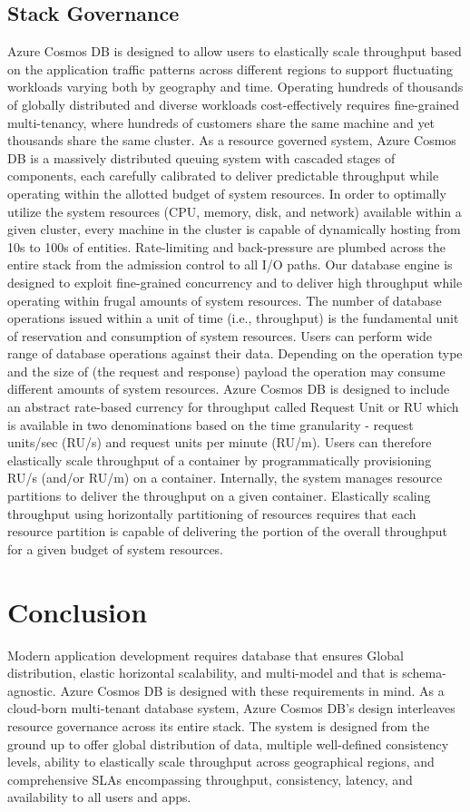 \subsection{Stack Governance}
Azure Cosmos DB is designed to allow users to elastically scale throughput based on the application traffic patterns across different regions to support fluctuating workloads varying both by geography and time. Operating hundreds of thousands of globally distributed and diverse workloads cost-effectively requires fine-grained multi-tenancy, where hundreds of customers share the same machine and yet thousands share the same cluster. As a resource governed system, Azure Cosmos DB is a massively distributed queuing system with cascaded stages of components, each carefully calibrated to deliver predictable throughput while operating within the allotted budget of system resources. In order to optimally utilize the system resources (CPU, memory, disk, and network) available within a given cluster, every machine in the cluster is capable of dynamically hosting from 10s to 100s of entities. Rate-limiting and back-pressure are plumbed across the entire stack from the admission control to all I/O paths. Our database engine is designed to exploit fine-grained concurrency and to deliver high throughput while operating within frugal amounts of system resources.
The number of database operations issued within a unit of time (i.e., throughput) is the fundamental unit of reservation and consumption of system resources. Users can perform wide range of database operations against their data. Depending on the operation type and the size of (the request and response) payload the operation may consume different amounts of system resources. Azure Cosmos DB is designed to include an abstract rate-based currency for throughput called Request Unit or RU which is available in two denominations based on the time granularity - request units/sec (RU/s) and request units per minute (RU/m). Users can therefore elastically scale throughput of a container by programmatically provisioning RU/s (and/or RU/m) on a container. Internally, the system manages resource partitions to deliver the throughput on a given container. Elastically scaling throughput using horizontally partitioning of resources requires that each resource partition is capable of delivering the portion of the overall throughput for a given budget of system resources.

\section{Conclusion}
Modern application development requires database that ensures Global distribution, elastic horizontal scalability, and multi-model and that is schema-agnostic. Azure Cosmos DB is designed with these requirements in mind. As a cloud-born multi-tenant database system, Azure Cosmos DB’s design interleaves resource governance across its entire stack. The system is designed from the ground up to offer global distribution of data, multiple well-defined consistency levels, ability to elastically scale throughput across geographical regions, and comprehensive SLAs encompassing throughput, consistency, latency, and availability to all users and apps.

